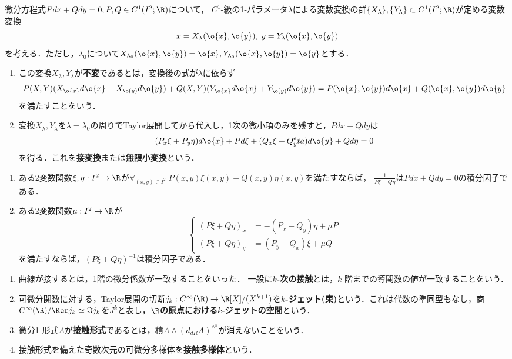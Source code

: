 \documentclass[uplatex,dvipdfmx]{jsreport}
\begin{document}
\begin{example}[接変換]
    微分方程式$Pdx+Qdy=0,P,Q\in C^1(I^2;\R)$について，
    $C^1$-級の1-パラメータ$\lambda$による変数変換の群$\{X_\lambda\},\{Y_\lambda\}\subset C^1(I^2;\R)$が定める変数変換
    \[x=X_\lambda(\o{x},\o{y}),\;y=Y_\lambda(\o{x},\o{y})\]
    を考える．ただし，$\lambda_0$について$X_{\lambda_0}(\o{x},\o{y})=\o{x},Y_{\lambda_0}(\o{x},\o{y})=\o{y}$とする．
    \begin{enumerate}
        \item この変換$X_\lambda,Y_\lambda$が\textbf{不変}であるとは，変換後の式が$\lambda$に依らず
        \[P(X,Y)(X_{\o{x}}d\o{x}+X_{\o(y)}d\o{y})+Q(X,Y)(Y_{\o{x}}d\o{x}+Y_{\o(y)}d\o{y})=P(\o{x},\o{y})d\o{x}+Q(\o{x},\o{y})d\o{y}\]
        を満たすことをいう．
        \item 変換$X_\lambda,Y_\lambda$を$\lambda=\lambda_0$の周りでTaylor展開してから代入し，1次の微小項のみを残すと，$Pdx+Qdy$は
        \[(P_x\xi+P_y\eta)d\o{x}+Pd\xi+(Q_x\xi+Q_y^eta)d\o{y}+Qd\eta=0\]
        を得る．これを\textbf{接変換}または\textbf{無限小変換}という．
    \end{enumerate}
\end{example}

\begin{theorem}[積分因子の十分条件]\mbox{}
    \begin{enumerate}
        \item ある2変数関数$\xi,\eta:I^2\to\R$が$\forall_{(x,y)\in I^2}\;P(x,y)\xi(x,y)+Q(x,y)\eta(x,y)$を満たすならば，
        $\frac{1}{P\xi+Q\eta}$は$Pdx+Qdy=0$の積分因子である．
        \item ある2変数関数$\mu:I^2\to\R$が
        \[\begin{cases}
            (P\xi+Q\eta)_x&=-(P_x-Q_y)\eta+\mu P\\
            (P\xi+Q\eta)_y&=(P_y-Q_x)\xi+\mu Q
        \end{cases}\]
        を満たすならば，$(P\xi+Q\eta)^{-1}$は積分因子である．
    \end{enumerate}
\end{theorem}

\begin{definition}\mbox{}
    \begin{enumerate}
        \item 曲線が接するとは，1階の微分係数が一致することをいった．
        一般に\textbf{$k$-次の接触}とは，$k$-階までの導関数の値が一致することをいう．
        \item 可微分関数に対する，Taylor展開の切断$j_k:C^\infty(\R)\to\R[X]/(X^{k+1})$を\textbf{$k$-ジェット(束)}という．これは代数の準同型もなし，商$C^\infty(\R)/\Ker j_k\simeq\Im j_k$を$J^k$と表し，\textbf{$\R$の原点における$k$-ジェットの空間}という．
        \item 微分1-形式$A$が\textbf{接触形式}であるとは，積$A\wedge(d_{dR}A)^{\wedge^n}$が消えないことをいう．
        \item 接触形式を備えた奇数次元の可微分多様体を\textbf{接触多様体}という．
    \end{enumerate}
\end{definition}
\end{document}
